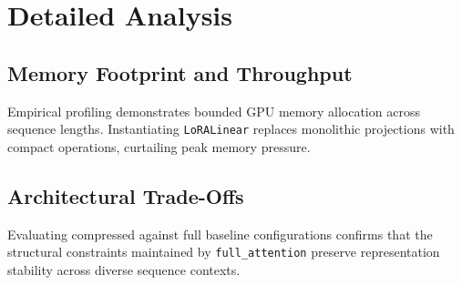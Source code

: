 \section{Detailed Analysis}

\subsection{Memory Footprint and Throughput}
Empirical profiling demonstrates bounded GPU memory allocation across sequence lengths. Instantiating \texttt{LoRALinear} replaces monolithic projections with compact operations, curtailing peak memory pressure.

\subsection{Architectural Trade-Offs}
Evaluating compressed against full baseline configurations confirms that the structural constraints maintained by \texttt{full_attention} preserve representation stability across diverse sequence contexts.
